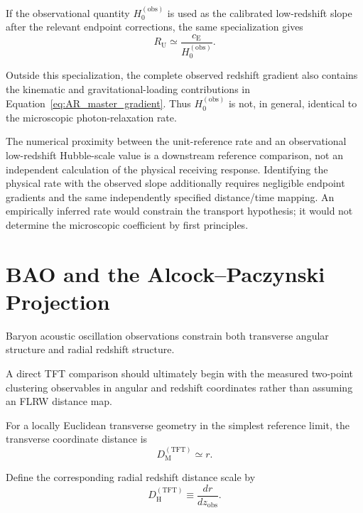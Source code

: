 If the observational quantity
\(H_0^{(\mathrm{obs})}\)
is used as the calibrated low-redshift slope after the relevant endpoint
corrections, the same specialization gives
\begin{equation}
    \boxed{
    R_{\mathrm U}
    \simeq
    \frac{
        c_{\mathrm E}
    }{
        H_0^{(\mathrm{obs})}
    }.
    }
    \label{eq:AS_RU_H0_observational_limit}
\end{equation}

Outside this specialization, the complete observed redshift gradient also
contains the kinematic and gravitational-loading contributions in
Equation~\eqref{eq:AR_master_gradient}. Thus
\(H_0^{(\mathrm{obs})}\)
is not, in general, identical to the microscopic photon-relaxation rate.

The numerical proximity between the unit-reference rate and an observational
low-redshift Hubble-scale value is a downstream reference comparison, not an
independent calculation of the physical receiving response. Identifying the
physical rate with the observed slope additionally requires negligible
endpoint gradients and the same independently specified distance/time mapping.
An empirically inferred rate would constrain the transport hypothesis; it
would not determine the microscopic coefficient by first principles.

\section{BAO and the Alcock--Paczynski Projection}

Baryon acoustic oscillation observations constrain both transverse angular
structure and radial redshift structure.

A direct TFT comparison should ultimately begin with the measured two-point
clustering observables in angular and redshift coordinates rather than
assuming an FLRW distance map.

For a locally Euclidean transverse geometry in the simplest reference limit,
the transverse coordinate distance is
\begin{equation}
    D_{\mathrm M}^{(\mathrm{TFT})}
    \simeq
    r.
    \label{eq:AR_DM}
\end{equation}

Define the corresponding radial redshift distance scale by
\begin{equation}
    D_{\mathrm H}^{(\mathrm{TFT})}
    \equiv
    \frac{
        dr
    }{
        dz_{\mathrm{obs}}
    }.
    \label{eq:AR_DH}
\end{equation}

